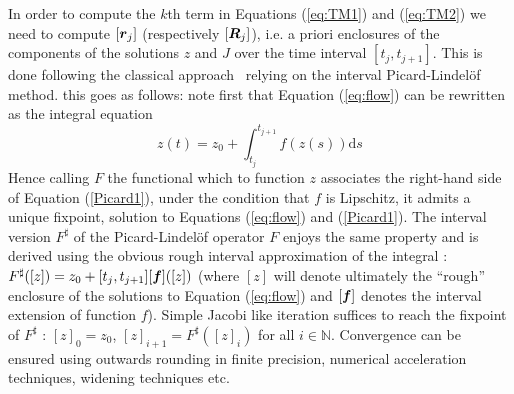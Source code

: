 \documentclass{sig-alternate-05-2015} %
\newcommand\ForAuthors[1]%
 {\par\smallskip                     %
  \begin{center}%
   \fbox%
   {\parbox{0.9\linewidth}%
    {\raggedright\sc--- #1}%
   }%
  \end{center}%
  \par\smallskip                     %
 }
\def\N{{\mathbb N}}
\def\intvl#1{\mbox{$[ #1 ]$}}
\begin{document}
In order to compute the $k$th term in Equations (\ref{eq:TM1}) and (\ref{eq:TM2}) we need
to compute $\intvl{\r_j}$ (respectively $\intvl{\bfm{R}_j}$), i.e. a priori enclosures of
the components of the solutions $z$ and $J$ over the
time interval $[t_j,t_{j+1}]$. This is done following the classical approach~\cite{Nedialkov99} relying on the  interval
Picard-Lindel\"of method. this goes as follows: note first that Equation 
(\ref{eq:flow}) can be rewritten as the integral equation
\begin{equation}
z(t) = z_0+\int_{t_j}^{t_{j+1}} \! f(z(s)) \mathrm{d}s
\label{Picard1}
\end{equation}
Hence calling $F$ the functional which to function $z$ associates the right-hand
side of Equation (\ref{Picard1}), under the condition that $f$ is Lipschitz, it 
admits a unique fixpoint, solution to Equations (\ref{eq:flow}) and
(\ref{Picard1}). The interval version ${F}^{\sharp}$ of the Picard-Lindel\"of operator $F$ 
enjoys the same property and is derived using the obvious rough interval approximation
of the integral : $F^{\sharp}(\intvl{z})=z_0+[t_j,t_{j+1}][\f](\intvl{z})$ (where
$\intvl{z}$ will denote ultimately the ``rough'' enclosure of the solutions to
Equation (\ref{eq:flow}) and $[\f]$ denotes  the interval extension of function $f$). 
Simple Jacobi like iteration suffices to reach the fixpoint of $F^{\sharp}$ : 
$\intvl{z}_0=z_0$, $\intvl{z}_{i+1}=F^{\sharp}(\intvl{z}_i)$ for all $i \in \N$. 
Convergence can be ensured using outwards rounding in finite precision,
numerical acceleration techniques, widening techniques etc. 

\end{document}
